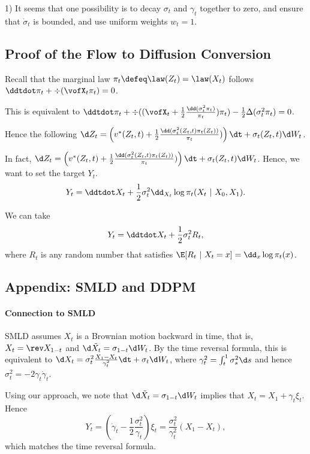 1) It seems that one possibility is to decay $\sigma_t$ and $\gamma_t$ together to zero, and ensure that $\dot \sigma_t$ is bounded, and use uniform weights $w_t = 1$. 


\subsection{Proof of the Flow to Diffusion Conversion}
Recall that the marginal law $\pi_t \defeq  \law(Z_t)=\law(X_t)$ follows $\ddtdot \pi_t + \div (\vofX_t \pi_t) = 0$. 

This is equivalent to 
$\ddtdot \pi_t + \div( (\vofX_t + \frac{1}{2 } 
\frac{\dd(\sigma^2_t \pi_t) }{\pi_t}) \pi_t) - \frac{1}{2} \Delta (\sigma^2_t \pi_t) = 0$. 

Hence the following  $
\d Z_t = 
\left (v^*(Z_t,t) + \frac{1}{2 } 
\frac{\dd(\sigma^2_t(Z_t,t) \pi_t(Z_t)) }{\pi_t})  \right )\dt + \sigma_t(Z_t,t)\d W_t
$. 

In fact, 
$\d Z_t = \left (v^*(Z_t,t) + \frac{1}{2 } 
\frac{\dd(\sigma^2_t(Z_t,t) \pi_t(Z_t)) }{\pi_t})  \right )\dt + \sigma_t(Z_t,t)\d W_t$. 
Hence, we want to set the target $Y_t$. 
$$
Y_t = \ddtdot X_t + \frac{1}{2} \sigma_t^2 \dd_{X_t} \log  \pi_t(X_t~|~ X_0,X_1). 
$$

We can take 
$$
Y_t = \ddtdot X_t + \frac{1}{2} \sigma_t^2 R_t, 
$$
where $R_t$ is any random number that satisfies $\E[R_t~
|~X_t = x] = \dd_{x} \log \pi_t(x)$. 


\subsection{Appendix: SMLD and DDPM}



\paragraph{Connection to SMLD}  
 SMLD \citep{song2019generative, song2020score, song2020denoising} assumes $X_t$ is a Brownian motion backward in time, that is, $X_t = \rev X_{1-t}$ and $\d \tilde X_t = \sigma_{1-t}\d W_t$. By the time reversal formula, this is equivalent to $\d X_t = \sigma_t^2 \frac{X_1 - X_t}{\gamma_t^2} \dt + \sigma_t \d W_t$, where $\gamma_{t}^2 = \int_{t}^1 \sigma_{s}^2 \d s$ and hence $\sigma_t^2 = - 2\gamma_t \dot \gamma_t$. 
 
Using our approach, we note that $\d \tilde X_t = \sigma_{1-t}\d W_t$ implies that $X_t = X_1 + \gamma_t \xi_t$. %
 Hence 
 $$Y_t =
 \left (\dot \gamma_t -\frac{1}{2} \frac{\sigma_t^2}{\gamma_t} \right )\xi_t = 
 \frac{\sigma_t^2}{\gamma_t^2} (X_1- X_t), 
 $$
 which matches the time reversal formula. 
 
